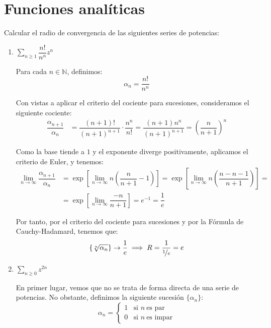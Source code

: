 \section{Funciones analíticas}

\begin{ejercicio}
    Calcular el radio de convergencia de las siguientes series de potencias:
    \begin{enumerate}
        \item $\displaystyle \sum_{n \geq 1} \dfrac{n!}{n^n}z^n$
        
        Para cada $n\in \mathbb{N}$, definimos:
        \[
            \alpha_n = \dfrac{n!}{n^n}
        \]

        Con vistas a aplicar el criterio del cociente para sucesiones, consideramos el siguiente cociente:
        \begin{align*}
             \dfrac{\alpha_{n+1}}{\alpha_n} &=  \dfrac{(n+1)!}{(n+1)^{n+1}} \cdot \dfrac{n^n}{n!}
            =  \dfrac{(n+1)n^n}{(n+1)^{n+1}}
            =  \left(\dfrac{n}{n+1}\right)^n
        \end{align*}

        Como la base tiende a $1$ y el exponente diverge positivamente, aplicamos el criterio de Euler, y tenemos:
        \begin{align*}
            \lim_{n \to \infty} \dfrac{\alpha_{n+1}}{\alpha_n} &=
            \exp\left[\lim_{n \to \infty} n\left(\dfrac{n}{n+1}-1\right)\right]
            = \exp\left[\lim_{n \to \infty} n\left(\dfrac{n-n-1}{n+1}\right)\right]
            =\\&= \exp\left[\lim_{n \to \infty} \dfrac{-n}{n+1}\right]
            = e^{-1} = \dfrac{1}{e}
        \end{align*}

        Por tanto, por el criterio del cociente para sucesiones y por la Fórmula de Cauchy-Hadamard, tenemos que:
        \begin{equation*}
            \{\sqrt[n]{\alpha_n}\} \to \dfrac{1}{e} \implies R = \dfrac{1}{\nicefrac{1}{e}} = e
        \end{equation*}
        \item $\displaystyle \sum_{n \geq 0} z^{2n}$
        
        En primer lugar, vemos que no se trata de forma directa de una serie de potencias. No obstante, definimos la siguiente sucesión $\{\alpha_n\}$:
        \[
            \alpha_n = \begin{cases}
                1 & \text{si } n\ \text{es par}\\
                0 & \text{si } n\ \text{es impar}
            \end{cases}
        \]


\end{enumerate}
\end{ejercicio}

